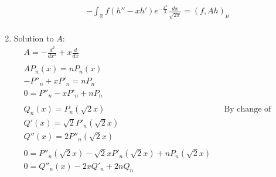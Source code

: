 \documentclass[12pt, a4paper]{article}
\begin{document}
\begin{enumerate}
\begin{align*}
        &-\int_\mathbb{R}f(h''-xh')e^{-\frac{x^2}{2}}\frac{dx}{\sqrt{2\pi}}=(f, Ah)_\mu\\
    \end{align*}
    \item Solution to $A$:
    \begin{align*}
        &A = -\frac{d^2}{dx^2}+x\frac{d}{dx}\\\\
        &AP_n(x) = nP_n(x)\\
        &-P''_n + xP'_n = nP_n\\
        & 0 = P''_n - xP'_n+nP_n\\\\
        &Q_n(x) = P_n(\sqrt{2}x)&&\text{By change of variables}\\
        &Q'(x) = \sqrt{2}P'_n(\sqrt{2}x)\\
        &Q''(x) = 2P''_n(\sqrt{2}x)\\\\
        &0 = P''_n(\sqrt{2}x) - \sqrt{2}xP'_n(\sqrt{2}x)+nP_n(\sqrt{2}x)\\
        &0 = Q''_n(x) - 2xQ'_n + 2nQ_n
    \end{align*}
\end{enumerate}
\vspace{0.3em}
\end{document}
